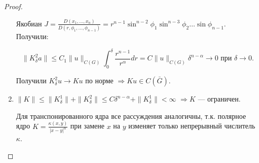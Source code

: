 \begin{proof}
\begin{enumerate}
{Якобиан $J = \frac{D(x_1, \dots, x_n)}{D(r, \phi_1, \dots, \phi_{n-1})} = r^{n-1}\sin^{n-2}\phi_1\sin^{n-3}\phi_2\dots\sin\phi_{n-1}.$ Получили:

$$\|K^2_\delta a\| \le C_1\|u\|_{C(G)}\int_0^\delta\frac{r^{n-1}}{r^\alpha}dr = C\|u\|_{C(G)}\delta^{n-\alpha} \to 0 \text{ при } \delta \to 0.$$

Получили $K^2_\delta u \to Ku$ по норме $\Rightarrow Ku \in C(\bar G).$
 
}

\item{$\|K\| \le \|K^1_\delta\| + \|K^2_\delta\|\le C\delta^{n-\alpha} + \|K^1_\delta\| < \infty$ $\Rightarrow K$ --- ограничен.

Для транспонированного ядра все рассуждения аналогичны, т.к. полярное ядро $K = \frac{\kappa(x,y)}{|x-y|^\alpha}$ при замене $x$ на $y$ изменяет только непрерывный числитель $\kappa$.
}

\end{enumerate}
\end{proof}










